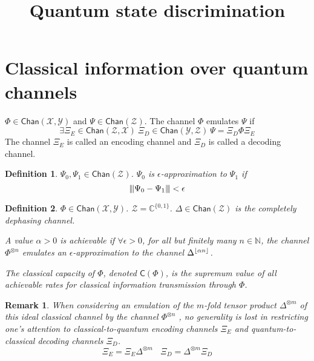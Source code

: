 \documentclass[aps,pra,onecolumn,notitlepage,superscriptaddress]{revtex4-1}
\DeclarePairedDelimiter{\floor}{\lfloor}{\rfloor}
\newcommand{\N}{\mathbb{N}}
\newcommand{\C}{\mathbb{C}}
\newcommand{\spc}[1]{\mathcal{#1}}
\newcommand{\ca}{\mathsf{C}}
\newcommand{\Chan}{{\mathsf{Chan}}}
\newcommand{\vertiii}[1]{{\left\vert\kern-0.25ex\left\vert\kern-0.25ex\left\vert #1 
    \right\vert\kern-0.25ex\right\vert\kern-0.25ex\right\vert}}
\newtheorem{defi}{Definition}
\newtheorem{rem}{Remark}
\begin{document}
    \title{Quantum state discrimination}
    \author{}
    \maketitle

    \section{Classical information over quantum channels}
    $\Phi \in \Chan(\spc X, \spc Y)$ and $\Psi \in \Chan(\spc Z)$. The channel $\Phi$ emulates $\Psi$ if 
    \begin{equation}
        \exists \Xi_E \in \Chan(\spc Z, \spc X) \ \Xi_D \in \Chan(\spc Y, \spc Z) \ \Psi = \Xi_D \Phi \Xi_E
    \end{equation}
    The channel $\Xi_E$ is called an encoding channel and $\Xi_D$ is called a decoding channel.

    \begin{defi}
        $\Psi_0, \Psi_1 \in \Chan(\spc Z)$. $\Psi_0$ is $\epsilon$-approximation to $\Psi_1$ if
        \begin{equation}
            \vertiii{ \Psi_0 - \Psi_1 } < \epsilon
        \end{equation}
    \end{defi}

    \begin{defi}
        $\Phi \in \Chan(\spc X, \spc Y)$. $\spc Z = \C^{\{ 0,1 \}}$. $\Delta \in \Chan(\spc Z)$ is the completely dephasing channel.

        A value $\alpha > 0$ is achievable if $\forall \epsilon > 0$, for all but finitely many $n \in \N$, the channel $\Phi^{\otimes n}$ emulates an $\epsilon$-approximation to the channel $\Delta^{\floor {\alpha n}}$.

        The classical capacity of $\Phi$, denoted $\ca(\Phi)$, is the supremum value of all achievable rates for classical information transmission through $\Phi$.
    \end{defi}

    \begin{rem}
        When considering an emulation of the $m$-fold tensor product $\Delta^{\otimes m}$ of this ideal classical channel by the channel $\Phi^{\otimes n}$ , no generality is lost in restricting one's attention to classical-to-quantum encoding channels $\Xi_E$ and quantum-to-classical decoding channels $\Xi_D$.
        \begin{equation}
            \Xi_E = \Xi_E \Delta^{\otimes m} \ \ \ \ 
            \Xi_D = \Delta^{\otimes m} \Xi_D
        \end{equation}
    \end{rem}
\end{document}
